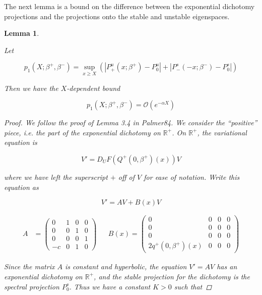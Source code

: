 \documentclass[12pt]{article}
\def\R{{\mathbb R}}
\newtheorem{lemma}{Lemma}
\begin{document}
The next lemma is a bound on the difference between the exponential dichotomy projections and the projections onto the stable and unstable eigenspaces.


\begin{lemma}\label{p1}

Let 

\begin{equation}
p_1(X; \beta^+, \beta^-) = \sup_{x \geq X} (|P^u_+(x; \beta^+) - P_0^u| + |P^s_-(-x; \beta^-) - P_0^s|)
\end{equation}

Then we have the $X$-dependent bound

\begin{equation}
p_1(X; \beta^+, \beta^-) = \mathcal{O}(e^{-\alpha X})
\end{equation} 

\begin{proof}

We follow the proof of Lemma 3.4 in Palmer84. We consider the ``positive'' piece, i.e. the part of the exponential dichotomy on $\R^+$. On $\R^+$, the variational equation is

\begin{equation}
V' = D_U F(Q^+(0, \beta^+)(x)) V
\end{equation}

where we have left the superscript $+$ off of $V$ for ease of notation. Write this equation as 

\begin{equation}\label{VsplitAB}
V' = AV + B(x)V
\end{equation}

\begin{align*}
A &= \begin{pmatrix}
0 & 1 & 0 & 0 \\
0 & 0 & 1 & 0 \\
0 & 0 & 0 & 1 \\
-c & 0 & 1 & 0
\end{pmatrix} &&
B(x) = 
\begin{pmatrix}
0 & 0 & 0 & 0 \\
0 & 0 & 0 & 0 \\
0 & 0 & 0 & 0 \\
2 q^+(0, \beta^+)(x) & 0 & 0 & 0
\end{pmatrix}
\end{align*}

Since the matrix $A$ is constant and hyperbolic, the equation $V' = AV$ has an exponential dichotomy on $\R^+$, and the stable projection for the dichotomy is the spectral projection $P^s_0$. Thus we have a constant $K > 0$ such that


\end{proof}
\end{lemma}
\end{document}

